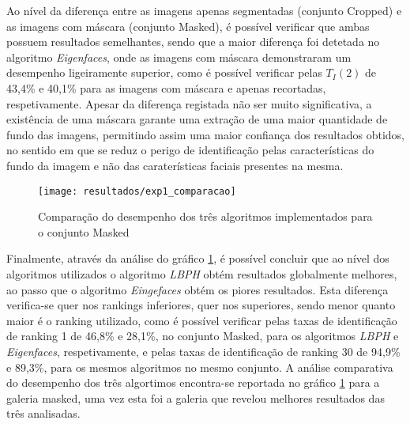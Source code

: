 Ao nível da diferença entre as imagens apenas segmentadas (conjunto Cropped) e as imagens com máscara (conjunto Masked), é possível verificar que ambas possuem resultados semelhantes, sendo que a maior diferença foi detetada no algoritmo \textit{Eigenfaces}, onde as imagens com máscara demonstraram um desempenho ligeiramente superior, como é possível verificar pelas $T_{I}(2)$ de 43,4\% e 40,1\% para as imagens com máscara e apenas recortadas, respetivamente. Apesar da diferença registada não ser muito significativa, a existência de uma máscara garante uma extração de uma maior quantidade de fundo das imagens, permitindo assim uma maior confiança dos resultados obtidos, no sentido em que se reduz o perigo de identificação pelas características do fundo da imagem e não das caraterísticas faciais presentes na mesma. 

\begin{figure}[ht]
  \begin{center}
    \leavevmode
    \texttt{[image: resultados/exp1\_comparacao]}
    \caption{Comparação do desempenho dos três algoritmos implementados para o conjunto Masked}
    \label{fig:exp1_comaparacao}
  \end{center}
\end{figure}

Finalmente, através da análise do gráfico \ref{fig:exp1_comaparacao}, é possível concluir que ao nível dos algoritmos utilizados o algoritmo \textit{LBPH} obtém resultados globalmente melhores, ao passo que o algoritmo \textit{Eingefaces} obtém os piores resultados. Esta diferença verifica-se quer nos rankings inferiores, quer nos superiores, sendo menor quanto maior é o ranking utilizado, como é possível verificar pelas taxas de identificação de ranking 1 de 46,8\% e 28,1\%, no conjunto Masked, para os algoritmos \textit{LBPH} e \textit{Eigenfaces}, respetivamente, e pelas taxas de identificação de ranking 30 de 94,9\% e 89,3\%, para os mesmos algoritmos no mesmo conjunto. A análise comparativa do desempenho dos três algortimos encontra-se reportada no gráfico \ref{fig:exp1_comaparacao} para a galeria masked, uma vez esta foi a galeria que revelou melhores resultados das três analisadas.

